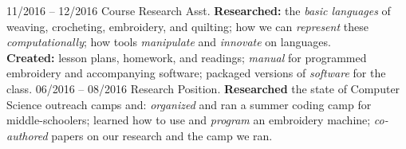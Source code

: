 
\begin{entrylist}
	\entry
		{11/2016 -- 12/2016}
    		{Course Research Asst.}
    		{\grinnell}
    		{\textbf{Researched:} the \emph{basic languages} of weaving, crocheting, embroidery, and quilting; how we can \emph{represent} these \emph{computationally};  how tools \emph{manipulate} and \emph{innovate} on languages. \\
    		\textbf{Created:} lesson plans, homework, and readings; \emph{manual} for programmed embroidery and accompanying software; packaged versions of \emph{software} for the class.
    		}
	\entry
		{06/2016 -- 08/2016}
    		{Research Position.}
   	 	{\grinnell}
    		{\textbf{Researched} the state of Computer Science outreach camps and:
    		\emph{organized} and ran a summer coding camp for middle-schoolers;
    		learned how to use and \emph{program} an embroidery machine;
    		\emph{co-authored} papers on our research and the camp we ran.
    		}
\end{entrylist}